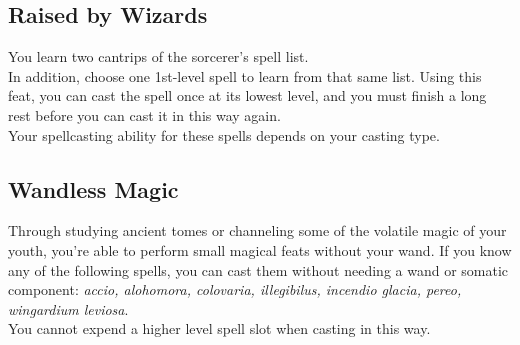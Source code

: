 \documentclass[a4paper,twocolumn,openany,nodeprecatedcode]{dndbook}
\begin{document}
    \subsection{Raised by Wizards}

        You learn two cantrips of the sorcerer's spell list.\\
        In addition, choose one 1st-level spell to learn from that same list.
        Using this feat, you can cast the spell once at its lowest level, and you must finish a long rest before you can cast it in this way again.\\

        Your spellcasting ability for these spells depends on your casting type.


    \subsection{Wandless Magic}

        Through studying ancient tomes or channeling some of the volatile magic of your youth, you're able to perform small magical feats without your wand.
        If you know any of the following spells, you can cast them without needing a wand or somatic component: \textit{accio, alohomora, colovaria, illegibilus, incendio glacia, pereo, wingardium leviosa}.\\
        You cannot expend a higher level spell slot when casting in this way.
\end{document}
